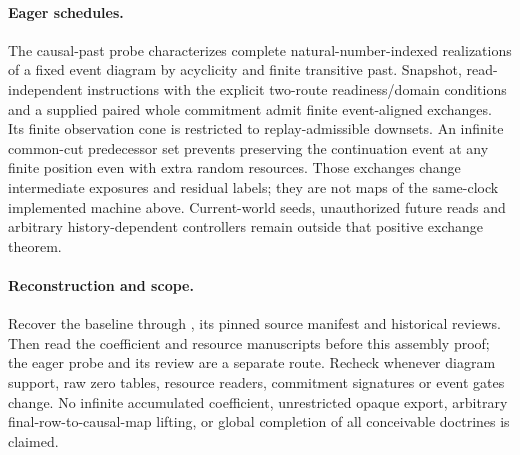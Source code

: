 \documentclass{article}
\begin{document}
\paragraph{Eager schedules.}
The causal-past probe characterizes complete natural-number-indexed realizations of a fixed event diagram by acyclicity and finite transitive past. Snapshot, read-independent instructions with the explicit two-route readiness/domain conditions and a supplied paired whole commitment admit finite event-aligned exchanges. Its finite observation cone is restricted to replay-admissible downsets. An infinite common-cut predecessor set prevents preserving the continuation event at any finite position even with extra random resources. Those exchanges change intermediate exposures and residual labels; they are not maps of the same-clock implemented machine above. Current-world seeds, unauthorized future reads and arbitrary history-dependent controllers remain outside that positive exchange theorem.

\paragraph{Reconstruction and scope.}
Recover the baseline through , its pinned source manifest and historical reviews. Then read the coefficient and resource manuscripts before this assembly proof; the eager probe and its review are a separate route. Recheck whenever diagram support, raw zero tables, resource readers, commitment signatures or event gates change. No infinite accumulated coefficient, unrestricted opaque export, arbitrary final-row-to-causal-map lifting, or global completion of all conceivable doctrines is claimed.
\end{document}
